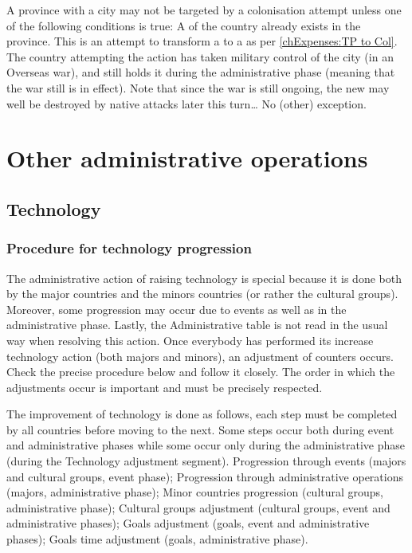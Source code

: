 \aparag[Cities] A province with a city may not be targeted by a colonisation
attempt unless one of the following conditions is true:
\bparag A \COL of the country already exists in the province.
\bparag This is an attempt to transform a \TP to a \COL as per
\ref{chExpenses:TP to Col}.
\bparag The country attempting the action has taken military control of the
city (in an Overseas war), and still holds it during the administrative phase
(meaning that the war still is in effect). Note that since the war is still
ongoing, the new \COL may well be destroyed by native attacks later this
turn\ldots
\bparag No (other) exception.





\section{Other administrative operations}\label{chExpenses:Techno and Competition}



\subsection{Technology}\label{chExpenses:Technology}


\subsubsection{Procedure for technology progression}
\aparag The administrative action of raising technology is special because it
is done both by the major countries and the minors countries (or rather the
cultural groups). Moreover, some progression may occur due to events as well
as in the administrative phase. Lastly, the Administrative table is not read
in the usual way when resolving this action.
\bparag Once everybody has performed its increase technology action (both
majors and minors), an adjustment of counters occurs. Check the precise
procedure below and follow it closely. The order in which the adjustments
occur is important and must be precisely respected.

 The improvement of technology is done
as follows, each step must be completed by all countries before moving to the
next. Some steps occur both during event and administrative phases while some
occur only during the administrative phase (during the Technology adjustment
segment).
\bparag Progression through events (majors and cultural groups, event phase);
\bparag Progression through administrative operations (majors, administrative
phase);
\bparag Minor countries progression (cultural groups, administrative phase);
\bparag Cultural groups adjustment (cultural groups, event and administrative
phases);
\bparag Goals adjustment (goals, event and administrative phases);
\bparag Goals time adjustment (goals, administrative phase).

